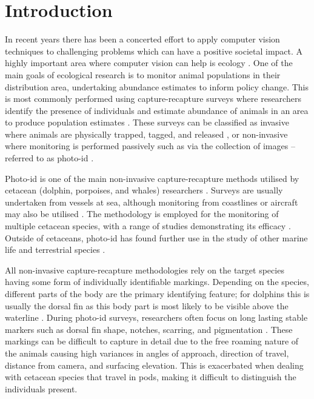 \chapter{Introduction}\label{ch:intro}


In recent years there has been a concerted effort to apply computer vision techniques to challenging problems which can have a positive societal impact. A highly important area where computer vision can help is ecology \cite{weinstein_computer_2018}. One of the main goals of ecological research is to monitor animal populations in their distribution area, undertaking abundance estimates to inform policy change. This is most commonly performed using capture-recapture surveys where researchers identify the presence of individuals and estimate abundance of animals in an area to produce population estimates \cite{constantine_abundance_2012, bigg_assessment_1982, sharpe_indian_2019, van_bressem_visual_2018, arso_civil_changing_2019, cheney_long-term_2014}. These surveys can be classified as invasive where animals are physically trapped, tagged, and released \cite{norris_tagging_1970, hobbs_bowhead_1982, andrews_best_2019}, or non-invasive where monitoring is performed passively such as via the collection of images -- referred to as photo-id \cite{vanbressem_visual_2018, urian_recommendations_2015, reisser_photographic_2008, langtimm_survival_2004, holmberg_estimating_2009}.

Photo-id is one of the main non-invasive capture-recapture methods utilised by cetacean (dolphin, porpoises, and whales) researchers \cite{hammond_individual_1990, evans_monitoring_2004}. Surveys are usually undertaken from vessels at sea, although monitoring from coastlines or aircraft may also be utilised \cite{payne_long_1986, forney_seasonal_1998, wursig_methods_1990}. The methodology is employed for the monitoring of multiple cetacean species, with a range of studies demonstrating its efficacy \cite{sharpe_indian_2019, miragliuolo_rissos_2004, feyrer_origin_2021, bigg_assessment_1982}. Outside of cetaceans, photo-id has found further use in the study of other marine life \cite{holmberg_estimating_2009, reisser_photographic_2008} and terrestrial species \cite{goswami_application_2007, clapham_automated_2020}.

All non-invasive capture-recapture methodologies rely on the target species having some form of individually identifiable markings. Depending on the species, different parts of the body are the primary identifying feature; for dolphins this is usually the dorsal fin as this body part is most likely to be visible above the waterline \cite{sharpe_indian_2019, baird_population_2009}. During photo-id surveys, researchers often focus on long lasting stable markers such as dorsal fin shape, notches, scarring, and pigmentation \cite{wursig_photographic_1977, lockyer_observations_1990, mann_cetacean_2000}. These markings can be difficult to capture in detail due to the free roaming nature of the animals causing high variances in angles of approach, direction of travel, distance from camera, and surfacing elevation. This is exacerbated when dealing with cetacean species that travel in pods, making it difficult to distinguish the individuals present.

